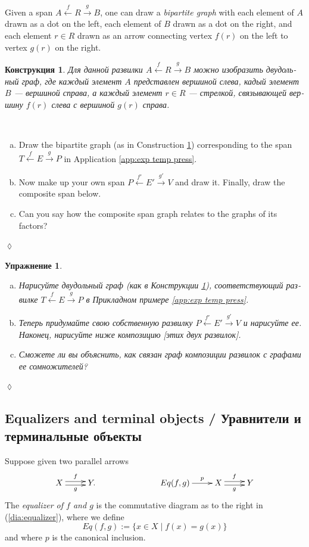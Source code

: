\documentclass[a4paper]{book}
\def\|{{\;|\;}}
\newcommand{\To}[1]{\xrightarrow{#1}}
\newcommand{\From}[1]{\xleftarrow{#1}}
\theoremstyle{myth}
\newtheorem{constructionENG}[envENG]{\begin{english}Construction\end{english}}
\newtheorem{excENG}[envENG]{\begin{english}Exercise\end{english}}
\newtheorem{definitionENG}[envENG]{\begin{english}Definition\end{english}}
\newenvironment{exerciseENG}{\begin{excENG}}{\hspace*{\fill}$\lozenge$\end{excENG}}
\newtheorem{constructionRUS}[envRUS]{Конструкция}
\newtheorem{excRUS}[envRUS]{Упражнение}
\newenvironment{exerciseRUS}{\begin{excRUS}}{\hspace*{\fill}$\lozenge$\end{excRUS}}
\def\sexc{\begin{enumerate}[a.)]\setlength{\itemsep}{.1cm}\setlength{\parskip}{.1cm}\item}
\def\next{\item}
\def\endsexc{\end{enumerate}}
\begin{document}
\begin{russian}
\begin{constructionENG}\label{const:bipartite}
Given a span $A\From{f} R\To{g} B$, one can draw a {\em bipartite graph} with each element of $A$ drawn as a dot on the left, each element of $B$ drawn as a dot on the right, and each element $r\in R$ drawn as an arrow connecting vertex $f(r)$ on the left to vertex $g(r)$ on the right.
\end{constructionENG}

\begin{constructionRUS}\label{const:bipartite}
Для данной развилки $A\From{f} R\To{g} B$ можно изобразить {\em двудольный граф}, где каждый элемент $A$ представлен вершиной слева, кадый элемент $B$ — вершиной справа, а каждый элемент $r\in R$ — стрелкой, связывающей вершину $f(r)$ слева с вершиной $g(r)$ справа.
\end{constructionRUS}

\begin{exerciseENG}~
\sexc Draw the bipartite graph (as in Construction \ref{const:bipartite}) corresponding to the span $T\From{f}E\To{g}P$ in Application \ref{app:exp temp press}.
\next Now make up your own span $P\From{f'}E'\To{g'}V$ and draw it. Finally, draw the composite span below. 
\next Can you say how the composite span graph relates to the graphs of its factors?
\endsexc
\end{exerciseENG}

\begin{exerciseRUS}~
\sexc Нарисуйте двудольный граф (как в Конструкции \ref{const:bipartite}), соответствующий развилке $T\From{f}E\To{g}P$ в Прикладном примере \ref{app:exp temp press}.
\next Теперь придумайте свою собственную развилку $P\From{f'}E'\To{g'}V$ и нарисуйте ее. Наконец, нарисуйте ниже композицию [этих двух развилок]. 
\next Сможете ли вы объяснить, как связан граф композиции развилок с графами ее сомножителей?
\endsexc
\end{exerciseRUS}


\subsection{Equalizers and terminal objects / Уравнители и терминальные объекты}

\begin{definitionENG}\label{def:equalizer}
Suppose given two parallel arrows 
\begin{align}\label{dia:equalizer}
\xymatrix{X\ar@<.5ex>[r]^f\ar@<-.5ex>[r]_g&Y.}\hspace{1in}\xymatrix{Eq(f,g)\ar[r]^-p&X\ar@<.5ex>[r]^f\ar@<-.5ex>[r]_g&Y}
\end{align}
The {\em equalizer of $f$ and $g$} is the commutative diagram as to the right in (\ref{dia:equalizer}), where we define $$Eq(f,g):=\{x\in X\|f(x)=g(x)\}$$ and where $p$ is the canonical inclusion.
\end{definitionENG}


\end{russian}
\end{document}
